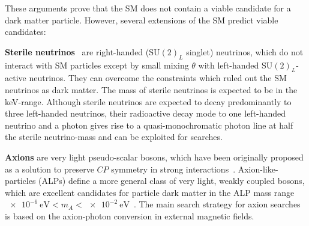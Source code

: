 These arguments prove that the SM does not contain a viable candidate for a dark matter particle. However, several extensions of the SM predict viable candidates:

\textbf{Sterile neutrinos}~\cite{Dodelson1994,Boyarsky2019} are right-handed (\(\text{SU}(2)_{L}\) singlet) neutrinos, which do not interact with SM particles except by small mixing \(\theta\) with left-handed \(\text{SU}(2)_{L}\)-active neutrinos. They can overcome the constraints which ruled out the SM neutrinos as dark matter. The mass of sterile neutrinos is expected to be in the \si{\kilo\electronvolt}-range. Although sterile neutrinos are expected to decay predominantly to three left-handed neutrinos, their radioactive decay mode to one left-handed neutrino and a photon gives rise to a quasi-monochromatic photon line at half the sterile neutrino-mass and can be exploited for searches.

\textbf{Axions} are very light pseudo-scalar bosons, which have been originally proposed as a solution to preserve \(CP\) symmetry in strong interactions~\cite{Peccei1977}. Axion-like-particles (ALPs) define a more general class of very light, weakly coupled  bosons, which are excellent candidates for particle dark matter in the ALP mass range \(\SI{e-6}{\electronvolt} < m_{A} < \SI{e-2}{\electronvolt}\)~\cite{Graham2015}. The main search strategy for axion searches is based on the axion-photon conversion in external magnetic fields.

